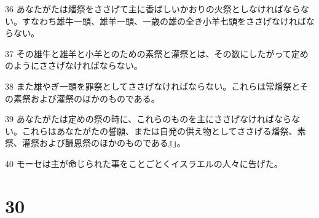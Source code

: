 \par 36 あなたがたは燔祭をささげて主に香ばしいかおりの火祭としなければならない。すなわち雄牛一頭、雄羊一頭、一歳の雄の全き小羊七頭をささげなければならない。
\par 37 その雄牛と雄羊と小羊とのための素祭と灌祭とは、その数にしたがって定めのようにささげなければならない。
\par 38 また雄やぎ一頭を罪祭としてささげなければならない。これらは常燔祭とその素祭および灌祭のほかのものである。
\par 39 あなたがたは定めの祭の時に、これらのものを主にささげなければならない。これらはあなたがたの誓願、または自発の供え物としてささげる燔祭、素祭、灌祭および酬恩祭のほかのものである』」。
\par 40 モーセは主が命じられた事をことごとくイスラエルの人々に告げた。

\chapter{30}

